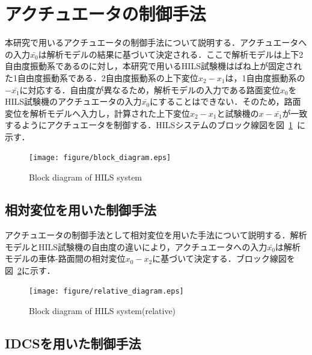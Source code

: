 \documentclass[a4paper,12pt]{article_vdlab_sotsuron}
\begin{document}
\newpage
\section{アクチュエータの制御手法}
本研究で用いるアクチュエータの制御手法について説明する．アクチュエータへの入力$\bar{x_0}$は解析モデルの結果に基づいて決定される．ここで解析モデルは上下2自由度振動系であるのに対し，本研究で用いるHILS試験機はばね上が固定された1自由度振動系である．2自由度振動系の上下変位$x_2-x_1$は，1自由度振動系の$-\bar{x_1}$に対応する．自由度が異なるため，解析モデルの入力である路面変位$x_0$をHILS試験機のアクチュエータの入力$\bar{x_0}$にすることはできない．そのため，路面変位を解析モデルへ入力し，計算された上下変位$x_2-x_1$と試験機の$x-\bar{x_1}$が一致するようにアクチュエータを制御する．HILSシステムのブロック線図を図~\ref{fig:block_diagram}~に示す．

\vspace*{7mm}
\begin{figure}[htp]
  \begin{center}
    \texttt{[image: figure/block\_diagram.eps]}
    \vspace*{3mm}
    \caption{Block diagram of HILS system}
    \label{fig:block_diagram}
  \end{center}
\end{figure}

\subsection{相対変位を用いた制御手法}
アクチュエータの制御手法として相対変位を用いた手法について説明する．解析モデルとHILS試験機の自由度の違いにより，アクチュエータへの入力$\bar{x_0}$は解析モデルの車体-路面間の相対変位$x_0-x_2$に基づいて決定する．ブロック線図を図~\ref{fig:relative_diagram}に示す．

\vspace*{7mm}
\begin{figure}[htp]
  \begin{center}
    \texttt{[image: figure/relative\_diagram.eps]}
    \vspace*{3mm}
    \caption{Block diagram of HILS system(relative)}
    \label{fig:relative_diagram}
  \end{center}
\end{figure}

\subsection{IDCSを用いた制御手法}
\label{sec:method_idcs}
\end{document}
